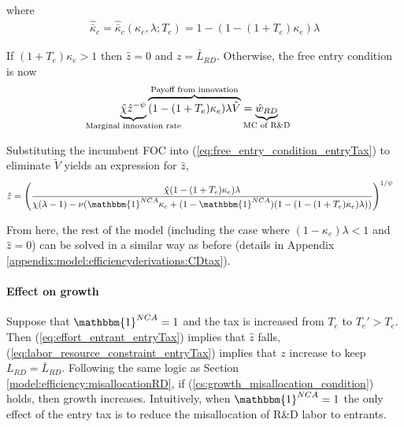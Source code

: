\documentclass[11pt,english]{article}
\begin{document}
where
\begin{align}
\hat{\bar{\kappa}}_c = \hat{\bar{\kappa}}_c(\kappa_e,\lambda;T_e) = 1 - (1-(1+T_e)\kappa_e)\lambda  \label{eq:barkappa_entryTax}
\end{align}

If $(1 + T_e) \kappa_e > 1$ then $\hat{z} = 0$ and $z = \bar{L}_{RD}$. Otherwise, the free entry condition is now
\begin{align}
\underbrace{\hat{\chi} \hat{z}^{-\psi}}_{\mathclap{\text{Marginal innovation rate}}} \overbrace{(1-(1+T_e)\kappa_e) \lambda \tilde{V}}^{\mathclap{\text{Payoff from innovation}}} &= \underbrace{\hat{w}_{RD}}_{\mathclap{\text{MC of R\&D}}} \label{eq:free_entry_condition_entryTax}
\end{align}

Substituting the incumbent FOC into (\ref{eq:free_entry_condition_entryTax}) to eliminate $\tilde{V}$ yields an expression for $\hat{z}$, 
\begin{align}
\hat{z} &= \Bigg( \frac{\hat{\chi} (1-(1+T_e)\kappa_{e}) \lambda}{\chi(\lambda -1) - \nu (\mathbbm{1}^{NCA}\kappa_c + (1-\mathbbm{1}^{NCA})(1 - (1-(1+T_e)\kappa_e)\lambda)) } \Bigg)^{1/\psi} \label{eq:effort_entrant_entryTax}
\end{align}

From here, the rest of the model (including the case where $(1-\kappa_e)\lambda < 1$ and $\hat{z} = 0$) can be solved in a similar way as before (details in Appendix \ref{appendix:model:efficiencyderivations:CDtax}). 

\paragraph{Effect on growth}

Suppose that $\mathbbm{1}^{NCA} = 1$ and the tax is increased from $T_e$ to $T_e' > T_e$. Then (\ref{eq:effort_entrant_entryTax}) implies that $\hat{z}$ falls, (\ref{eq:labor_resource_constraint_entryTax}) implies that $z$ increase to keep $L_{RD} = \bar{L}_{RD}$. Following the same logic as Section \ref{model:efficiency:misallocationRD}, if (\ref{cs:growth_misallocation_condition}) holds, then growth increases. Intuitively, when $\mathbbm{1}^{NCA} = 1$ the only effect of the entry tax is to reduce the misallocation of R\&D labor to entrants. 
\end{document}
